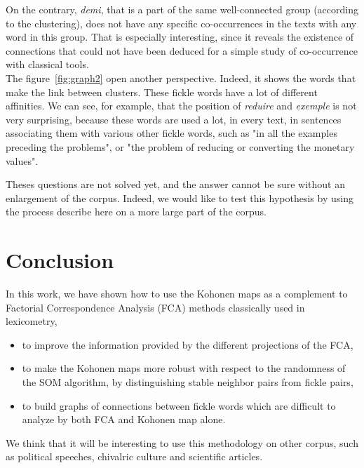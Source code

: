 \documentclass[preprint]{elsarticle}
\begin{document}
On the contrary, \textit{demi}, that is a part of the same well-connected group (according to the clustering), does not have any specific co-occurrences in the texts with any word in this group. That is especially interesting, since it reveals the existence of connections that could not have been deduced for a simple study of co-occurrence with classical tools.\\

The figure~\ref{fig:graph2} open another perspective. Indeed, it shows the words that make the link between clusters. These fickle words have a lot of different affinities. We can see, for example, that the position of \textit{reduire} and \textit{exemple} is not very surprising, because these words are used a lot, in every text, in sentences associating them with various other fickle words, such as "in all the examples preceding the problems", or "the problem of reducing or converting the monetary values".

Theses questions are not solved yet, and the answer cannot be sure without an enlargement of the corpus. Indeed, we would like to test this hypothesis by using the process describe here on a more large part of the corpus.

\section*{Conclusion}

In this work, we have shown how to use the Kohonen maps as a complement to Factorial Correspondence  Analysis (FCA) methods classically used in lexicometry,

\begin{itemize}
\item to improve the information provided by the different projections of the FCA,

\item to make the Kohonen maps more robust with respect to the randomness of the SOM  algorithm, by distinguishing stable neighbor pairs from fickle pairs,

\item to build graphs of connections between fickle words which are difficult to analyze by both FCA and Kohonen map alone.
\end{itemize}

We think that it will be interesting to use this methodology on other corpus, such as political speeches, chivalric culture and scientific articles. 
\newpage

\end{document}
